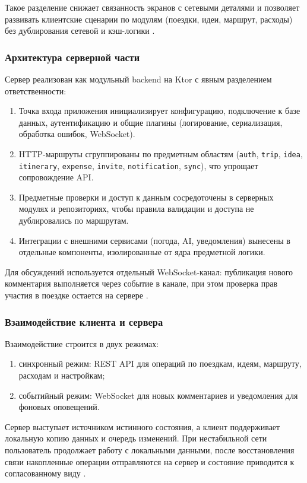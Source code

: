 Такое разделение снижает связанность экранов с сетевыми деталями и позволяет развивать клиентские сценарии по модулям (поездки, идеи, маршрут, расходы) без дублирования сетевой и кэш-логики .

\subsubsection{Архитектура серверной части}
Сервер реализован как модульный backend на Ktor с явным разделением ответственности:
\begin{enumerate}
    \item Точка входа приложения инициализирует конфигурацию, подключение к базе данных, аутентификацию и общие плагины (логирование, сериализация, обработка ошибок, WebSocket).
    \item HTTP-маршруты сгруппированы по предметным областям (\texttt{auth}, \texttt{trip}, \texttt{idea}, \texttt{itinerary}, \texttt{expense}, \texttt{invite}, \texttt{notification}, \texttt{sync}), что упрощает сопровождение API.
    \item Предметные проверки и доступ к данным сосредоточены в серверных модулях и репозиториях, чтобы правила валидации и доступа не дублировались по маршрутам.
    \item Интеграции с внешними сервисами (погода, AI, уведомления) вынесены в отдельные компоненты, изолированные от ядра предметной логики.
\end{enumerate}

Для обсуждений используется отдельный WebSocket-канал: публикация нового комментария выполняется через событие в канале, при этом проверка прав участия в поездке остается на сервере .

\subsubsection{Взаимодействие клиента и сервера}
Взаимодействие строится в двух режимах:
\begin{enumerate}
    \item синхронный режим: REST API для операций по поездкам, идеям, маршруту, расходам и настройкам;
    \item событийный режим: WebSocket для новых комментариев и уведомления для фоновых оповещений.
\end{enumerate}

Сервер выступает источником истинного состояния, а клиент поддерживает локальную копию данных и очередь изменений. При нестабильной сети пользователь продолжает работу с локальными данными, после восстановления связи накопленные операции отправляются на сервер и состояние приводится к согласованному виду .

